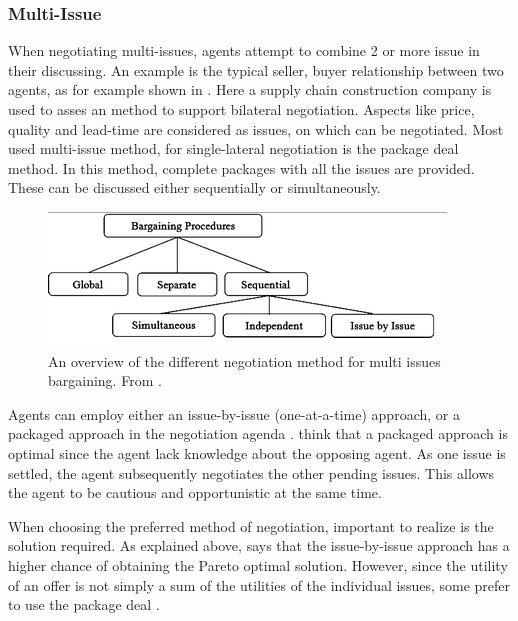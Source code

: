 \subsubsection{Multi-Issue}
 When negotiating multi-issues, agents attempt to combine 2 or more issue in their discussing. An example is the typical seller, buyer relationship between two agents, as for example shown in \citet{schramm2013bilateral}. Here a supply chain construction company is used to asses an method to support bilateral negotiation. Aspects like price, quality and lead-time are considered as issues, on which can be negotiated. Most used multi-issue method, for single-lateral negotiation is the package deal method. In this method, complete packages with all the issues are provided. These can be discussed either sequentially or simultaneously. 

 \begin{figure}[h]
 	\centering
 	\includegraphics[width=0.7\linewidth]{img/multi-lateral}
 	\caption{An overview of the different negotiation method for multi issues bargaining. From \citep{abedin2014agenda}.}
 	\label{fig:multi-lateral}
 \end{figure}
 
 Agents can employ either an issue-by-issue (one-at-a-time) approach, or a packaged approach in the negotiation agenda \citep{fatima2004agenda}. \citet{abedin2014agenda} think that a packaged approach is optimal since the agent lack knowledge about the opposing agent. As one issue is settled, the agent subsequently negotiates the other pending issues. This allows the agent to be cautious and opportunistic at the same time.
 
 When choosing the preferred method of negotiation, important to realize is the solution required. As explained above,\citet{abedin2014agenda} says that the issue-by-issue approach has a higher chance of obtaining the Pareto optimal solution. However, since the utility of an offer is not simply a sum of the utilities of the individual issues, some prefer to use the package deal \citep{zheng2015automated}.



